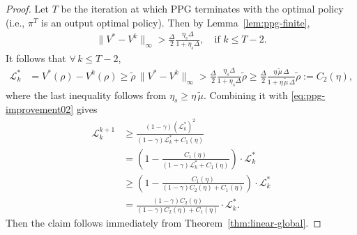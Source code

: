 \begin{proof}
    Let $T$ be the iteration at which PPG terminates with the optimal policy (i.e., $\pi^T$ is an output optimal policy). Then by Lemma~\ref{lem:ppg-finite},
\begin{align*}
\|V^*-V^k\|_\infty > \frac{\Delta}{2}\frac{\eta_s\Delta}{1+\eta_s\Delta},\quad \mbox{if }k\leq T-2.
\end{align*}
It follows that $\forall\, k\leq T-2$,
\begin{align*}
\mathcal{L}_k^* & = V^*(\rho) - V^k(\rho)\geq \tilde{\rho}\,\|V^*-V^k\|_\infty > \frac{\Delta}{2}\frac{\eta_s\Delta}{1+\eta_s\Delta}\tilde{\rho} \geq \frac{\Delta}{2}\frac{\eta\,\tilde{\mu}\,\Delta}{1+\eta\,\tilde{\mu}\,\Delta}\tilde{\rho}:=C_2(\eta),
\end{align*}
where the last inequality follows from $\eta_s\geq \eta\,\tilde{\mu}$. Combining it with \eqref{eq:ppg-improvement02} gives 
\begin{align*}
\mathcal{L} _{k}^{k+1}&\ge \frac{(1-\gamma )(\mathcal{L} _{k}^{*})^2}{(1-\gamma )\mathcal{L} _{k}^{*}+C_1(\eta )}
\\
\,\,      &=\left( 1-\frac{C_1(\eta)}{(1-\gamma )\mathcal{L} _{k}^{*}+C_1(\eta)} \right) \cdot \mathcal{L} _{k}^{*}
\\
\,\,      &\ge \left( 1-\frac{C_1(\eta )}{(1-\gamma )C_2\left( \eta \right) +C_1(\eta )} \right) \cdot \mathcal{L} _{k}^{*}
\\
\,\,      &=\frac{(1-\gamma )C_2\left( \eta \right)}{(1-\gamma )C_2\left( \eta \right) +C_1(\eta )}\cdot \mathcal{L} _{k}^{*}.
\end{align*}
Then the claim follows immediately from Theorem~\ref{thm:linear-global}.
\end{proof}

